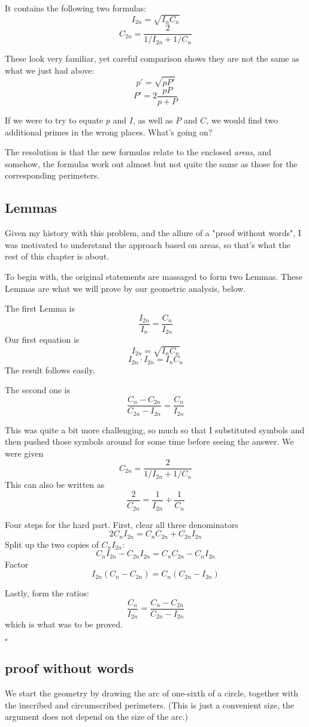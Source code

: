 \documentclass[11pt, oneside]{article}
\begin{document}
It contains the following two formulas:
\[ I_{2n} = \sqrt{I_n C_n} \]
\[ C_{2n} = \frac{2}{1/I_{2n} + 1/C_n} \]

These look very familiar, yet careful comparison shows they are not the same as what we just had above:
\[ p' = \sqrt{pP'} \]
\[ P' = 2 \frac{pP}{p + P} \]

If we were to try to equate $p$ and $I$, as well as $P$ and $C$, we would find two additional primes in the wrong places.  What's going on?

The resolution is that the new formulas relate to the enclosed \emph{areas}, and somehow, the formulas work out almost but not quite the same as those for the corresponding perimeters.

\subsection*{Lemmas}
Given my history with this problem, and the allure of a "proof without words", I was motivated to understand the approach based on areas, so that's what the rest of this chapter is about.

To begin with, the original statements are massaged to form two Lemmas.  These Lemmas are what we will prove by our geometric analysis, below.

The first Lemma is
\[ \frac{I_{2n}}{I_n} = \frac{C_n} {I_{2n}} \]
Our first equation is
\[ I_{2n} = \sqrt{I_n C_n} \]
\[  I_{2n} \cdot I_{2n} = I_n C_n \]
The result follows easily.

The second one is
\[ \frac{C_n - C_{2n}} {C_{2n} - I_{2n}} = \frac{C_n}{I_{2n}} \]

This was quite a bit more challenging, so much so that I substituted symbols and then pushed those symbols around for some time before seeing the answer.  We were given
\[ C_{2n} = \frac{2}{1/I_{2n} + 1/C_n} \]
This can also be written as
\[ \frac{2}{C_{2n}} = \frac{1}{I_{2n}} + \frac{1}{C_n} \]

Four steps for the hard part.  First, clear all three denominators
\[ 2 C_n I_{2n} = C_n C_{2n} + C_{2n} I_{2n} \]
Split up the two copies of $C_n I_{2n}$:
\[  C_n I_{2n} - C_{2n} I_{2n} = C_n C_{2n} - C_n I_{2n} \]
Factor
\[  I_{2n}(C_n - C_{2n}) = C_n (C_{2n} - I_{2n}) \]

Lastly, form the ratios:
\[ \frac{C_n}{I_{2n}} = \frac{C_n - C_{2n}}{C_{2n} - I_{2n}} \]
which is what was to be proved.

$\square$

\subsection*{proof without words}
We start the geometry by drawing the arc of one-sixth of a circle, together with the inscribed and circumscribed perimeters.  (This is just a convenient size, the argument does not depend on the size of the arc.)
\end{document}

